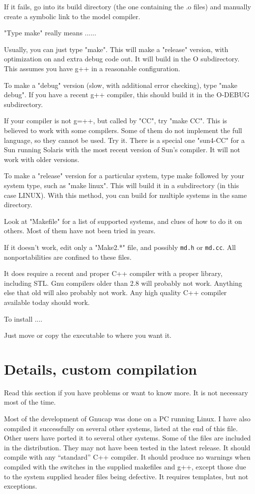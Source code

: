If it fails, go into its build directory (the one containing the .o
files) and manually create a symbolic link to the model compiler.


"Type make" really means ......

Usually, you can just type "make".  This will make a "release"
version, with optimization on and extra debug code out.  It will build
in the O subdirectory.  This assumes you have g++ in a reasonable
configuration.

To make a "debug" version (slow, with additional error checking), type
"make debug".  If you have a recent g++ compiler, this should build it
in the O-DEBUG subdirectory.

If your compiler is not g=++, but called by "CC", try "make CC".  This
is believed to work with some compilers.  Some of them do not
implement the full language, so they cannot be used.  Try it.  There
is a special one "sun4-CC" for a Sun running Solaris with the most
recent version of Sun's compiler.  It will not work with older
versions.

To make a "release" version for a particular system, type make
followed by your system type, such as "make linux".  This will build
it in a subdirectory (in this case LINUX).  With this method, you can
build for multiple systems in the same directory.

Look at "Makefile" for a list of supported systems, and clues of how
to do it on others.  Most of them have not been tried in years.

If it doesn't work, edit only a "Make2.*" file, and possibly {\tt md.h} or
{\tt md.cc}.  All nonportabilities are confined to these files.

It does require a recent and proper C++ compiler with a proper
library, including STL.  Gnu compilers older than 2.8 will probably
not work.  Anything else that old will also probably not work.  Any
high quality C++ compiler available today should work.

To install ....

Just move or copy the executable to where you want it.

\section{Details, custom compilation}

Read this section if you have problems or want to know more.  It is
not necessary most of the time.

Most of the development of Gnucap was done on a PC running Linux.  I have
also compiled it successfully on several other systems, listed at the
end of this file.  Other users have ported it to several other
systems.  Some of the files are included in the distribution.  They
may not have been tested in the latest release.  It should compile
with any ``standard'' C++ compiler.  It should produce no warnings when
compiled with the switches in the supplied makefiles and g++, except
those due to the system supplied header files being defective.  It
requires templates, but not exceptions.

